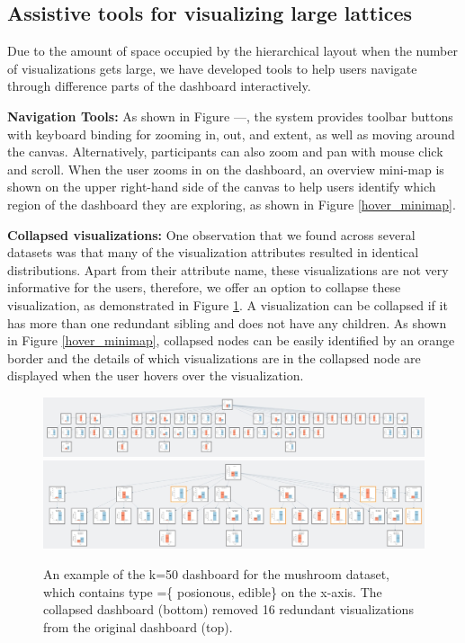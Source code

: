 \subsection{Assistive tools for visualizing large lattices}
Due to the amount of space occupied by the hierarchical layout when the number of visualizations gets large, we have developed tools to help users navigate through difference parts of the dashboard interactively. 
\par \textbf{Navigation Tools:} As shown in Figure ---, the system provides toolbar buttons with keyboard binding for zooming in, out, and extent, as well as moving around the canvas. Alternatively, participants can also zoom and pan with mouse click and scroll. When the user zooms in on the dashboard, an overview mini-map is shown on the upper right-hand side of the canvas to help users identify which region of the dashboard they are exploring, as shown in Figure \ref{hover_minimap}. 
\par \textbf{Collapsed visualizations:} 
One observation that we found across several datasets was that many of the visualization attributes resulted in identical distributions. Apart from their attribute name, these visualizations are not very informative for the users, therefore, we offer an option to collapse these visualization, as demonstrated in Figure \ref{collapse_demo}. A visualization can be collapsed if it has more than one redundant sibling and does not have any children. As shown in Figure \ref{hover_minimap}, collapsed nodes can be easily identified by an orange border and the details of which visualizations are in the collapsed node are displayed when the user hovers over the visualization.
\begin{figure}[ht!]
\label{collapse_demo}
\centering
\includegraphics[width=\linewidth]{figures/k50_original.jpeg}
\noindent\makebox[\linewidth]{\rule{\linewidth}{0.4pt}}
\includegraphics[width=\linewidth]{figures/k50_collapsed.jpeg}
\caption{An example of the k=50 dashboard for the mushroom dataset, which contains type =\{ posionous, edible\} on the x-axis. The collapsed dashboard (bottom) removed 16 redundant visualizations from the original dashboard (top). }
\end{figure}

